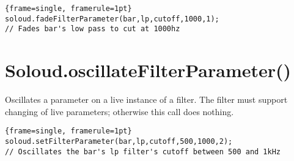 \begin{lstlisting}{frame=single, framerule=1pt}
soloud.fadeFilterParameter(bar,lp,cutoff,1000,1); 
// Fades bar's low pass to cut at 1000hz
\end{lstlisting}

\section{Soloud.oscillateFilterParameter()}
Oscillates a parameter on a live instance of a filter. The filter must support changing of live parameters; otherwise this call does nothing.

\begin{lstlisting}{frame=single, framerule=1pt}
soloud.setFilterParameter(bar,lp,cutoff,500,1000,2); 
// Oscillates the bar's lp filter's cutoff between 500 and 1kHz
\end{lstlisting}

